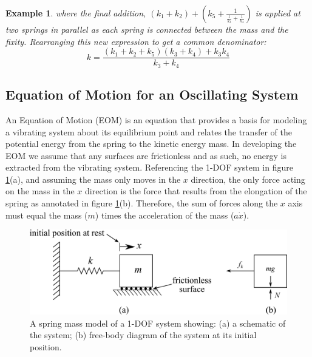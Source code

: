 \documentclass[12pt,letter]{article}
\newtheorem{ex}{Example}
\numberwithin{ex}{section} %
\newenvironment{example}{\begin{mdframed}[middlelinewidth=0.5mm]\begin{ex}\normalfont}{\end{ex}\end{mdframed}}
\numberwithin{re}{section} %
\numberwithin{vcs}{section} %
\begin{document}
\begin{example}
				\noindent where the final addition, $(k_1+k_2) + (k_5+\frac{1}{\frac{1}{k_3}+\frac{1}{k_4}})$ is applied at two springs in parallel as each spring is connected between the mass and the fixity. Rearranging this new expression to get a common denominator:
				\begin{equation}
					k= \frac{(k_1+k_2+k_5)(k_3+k_4)+k_3k_4}{k_3+k_4}  
				\end{equation}				
			\end{example}	

					
	\subsection{Equation of Motion for an Oscillating System}			
			
        An Equation of Motion (EOM) is an equation that provides a basis for modeling a vibrating system about its equilibrium point and relates the transfer of the potential energy from the spring to the kinetic energy mass. In developing the EOM we assume that any surfaces are frictionless and as such, no energy is extracted from the vibrating system. Referencing the 1-DOF system in figure \ref{fig:EOM_1-DOF-mass_horizontal}(a), and assuming the mass only moves in the $x$ direction, the only force acting on the mass in the $x$ direction is the force that results from the elongation of the spring as annotated in figure \ref{fig:EOM_1-DOF-mass_horizontal}(b). Therefore, the sum of forces along the $x$ axis must equal the mass ($m$) times the acceleration of the mass ($a\dot{x}$). 

		\begin{figure}[H]
			\centering
			\includegraphics[]{../figures/EOM_1-DOF-mass_horizontal.png}
			\caption{A spring mass model of a 1-DOF system showing: (a) a schematic of the system; (b)  free-body diagram of the system at its initial position.}
			\label{fig:EOM_1-DOF-mass_horizontal}
		\end{figure}			
		
\end{document}
